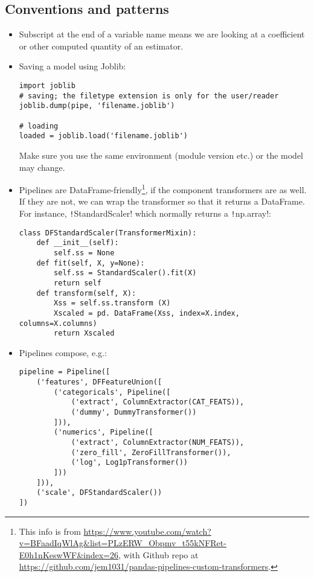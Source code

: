 \documentclass[11pt]{article}
\theoremstyle{definition}
\begin{document}
\subsection{Conventions and patterns}
\begin{itemize}
\item Subscript at the end of a variable name means we are looking at a coefficient or other computed quantity of an estimator.	
\item Saving a model using Joblib:
\begin{verbatim}
import joblib
# saving; the filetype extension is only for the user/reader
joblib.dump(pipe, 'filename.joblib') 

# loading
loaded = joblib.load('filename.joblib')
\end{verbatim}
Make sure you use the same environment (module version etc.) or the model may change.
\item Pipelines are DataFrame-friendly\footnote{This info is from \url{https://www.youtube.com/watch?v=BFaadIqWlAg&list=PLzERW_Obpmv_t55kNFRet-E0h1nKeswWF&index=26}, with Github repo at \url{https://github.com/jem1031/pandas-pipelines-custom-transformers}.}, if the component transformers are as well. If they are not, we can wrap the transformer so that it returns a DataFrame. For instance, \texttt!StandardScaler! which normally returns a \texttt!np.array!:
\begin{verbatim}
class DFStandardScaler(TransformerMixin):
    def __init__(self):
        self.ss = None
    def fit(self, X, y=None):
        self.ss = StandardScaler().fit(X)
        return self    
    def transform(self, X):
        Xss = self.ss.transform (X)
        Xscaled = pd. DataFrame(Xss, index=X.index, columns=X.columns)
        return Xscaled
\end{verbatim}
\item Pipelines compose, e.g.:
\begin{verbatim}
pipeline = Pipeline([
    ('features', DFFeatureUnion([
        ('categoricals', Pipeline([
            ('extract', ColumnExtractor(CAT_FEATS)),
            ('dummy', DummyTransformer())
        ])),
        ('numerics', Pipeline([
            ('extract', ColumnExtractor(NUM_FEATS)),
            ('zero_fill', ZeroFillTransformer()),
            ('log', Log1pTransformer())
        ]))
    ])),
    ('scale', DFStandardScaler())
])    
\end{verbatim}

\end{itemize}
\end{document}
